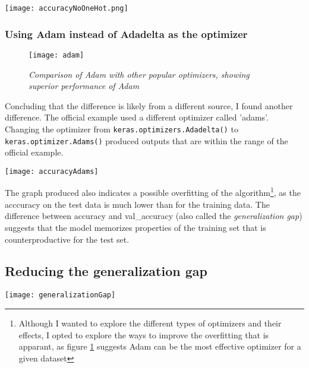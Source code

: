 \documentclass{article}
\begin{document}
\begin{center}
    \texttt{[image: accuracyNoOneHot.png]}
\end{center}

\subsubsection{Using Adam instead of Adadelta as the optimizer}

\begin{figure}[H]
    \begin{center}
        \texttt{[image: adam]}
        \caption{\small \sl Comparison of Adam with other popular optimizers, showing superior performance of Adam\autocite{diederik14}}
        \label{fig:adam}
    \end{center}
\end{figure}

Concluding that the difference is likely from a different source, I found another difference. The official example used a different optimizer called 'adams'. Changing the optimizer from \texttt{keras.optimizers.Adadelta()} to \texttt{keras.optimizer.Adams()} produced outputs that are within the range of the official example.

\begin{center}
    \texttt{[image: accuracyAdams]}
\end{center}

The graph produced also indicates a possible overfitting of the algorithm\footnote{Although I wanted to explore the different types of optimizers and their effects, I opted to explore the ways to improve the overfitting that is apparant, as figure \ref{fig:adam} suggests Adam can be the most effective optimizer for a given dataset
},  as the acccuracy on the test data is much lower than for the training data. The difference between accuracy and val\_accuracy (also called the \emph{generalization gap})  suggests that the model memorizes properties of the training set that is counterproductive for the test set.

\subsection{Reducing the generalization gap}

\begin{center}
    \texttt{[image: generalizationGap]}
\end{center}
\end{document}
